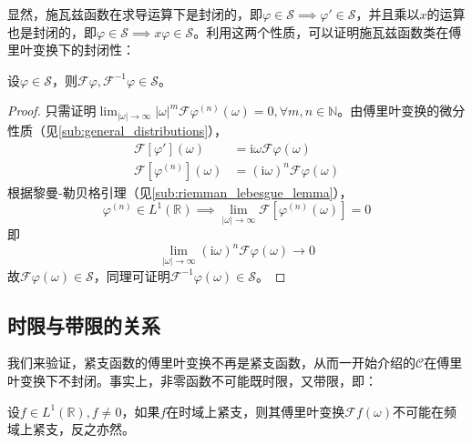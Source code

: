 \documentclass{ctexbook}
\begin{document}
显然，施瓦兹函数在求导运算下是封闭的，即$\varphi\in\mathcal{S}\implies \varphi'\in\mathcal{S}$，并且乘以$x$的运算也是封闭的，即$\varphi\in\mathcal{S}\implies x\varphi\in\mathcal{S}$。利用这两个性质，可以证明施瓦兹函数类在傅里叶变换下的封闭性：
\begin{theorem}[施瓦兹函数类在傅里叶变换下的封闭性]
    设$\varphi\in\mathcal{S}$，则$\mathcal{F} \varphi,\mathcal{F} ^{-1} \varphi\in\mathcal{S}$。
\end{theorem}
\begin{proof}
    只需证明$\lim_{|\omega|\to\infty}|\omega|^m \mathcal{F} \varphi^{(n)}(\omega)=0,\forall m,n\in\mathbb{N}$。由傅里叶变换的微分性质（见\ref{sub:general_distributions}），
    \begin{align*}
    \mathcal{F} [\varphi'](\omega)&=\mathrm{i}\omega \mathcal{F} \varphi(\omega)\\
    \mathcal{F} [\varphi^{(n)}](\omega)&=(\mathrm{i}\omega)^n \mathcal{F} \varphi(\omega)
\end{align*}
根据黎曼-勒贝格引理（见\ref{sub:riemman_lebesgue_lemma}），\[\varphi^{(n)}\in L^1(\mathbb{R})\implies\lim_{|\omega|\to\infty}\mathcal{F}\left[ \varphi^{(n)}(\omega)\right]=0\]
即\[\lim_{|\omega|\to\infty}(\mathrm{i}\omega)^n \mathcal{F} \varphi(\omega)\to 0\]
故$\mathcal{F} \varphi(\omega)\in\mathcal{S} $，同理可证明$\mathcal{F}^{-1} \varphi(\omega)\in\mathcal{S} $。
\end{proof}

\subsection{时限与带限的关系}\label{sub:time_freq_limit}
我们来验证，紧支函数的傅里叶变换不再是紧支函数，从而一开始介绍的$\mathcal{C} $在傅里叶变换下不封闭。事实上，非零函数不可能既时限，又带限，即：\begin{theorem}
设$f\in L^1(\mathbb{R}),f\neq 0$，如果$f$在时域上紧支，则其傅里叶变换$\mathcal{F} f(\omega)$不可能在频域上紧支，反之亦然。
    
\end{theorem}
\end{document}
